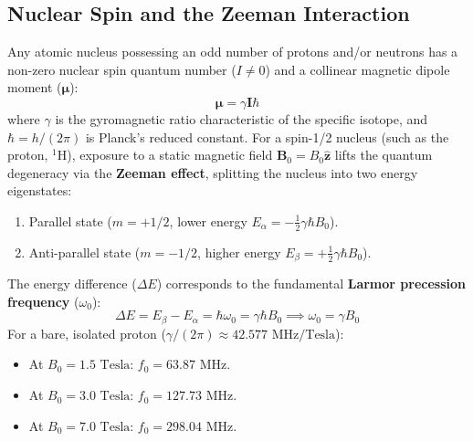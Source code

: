 \documentclass[11pt,a4paper]{article}
\begin{document}
\subsection{Nuclear Spin and the Zeeman Interaction}
Any atomic nucleus possessing an odd number of protons and/or neutrons has a non-zero nuclear spin quantum number ($I \neq 0$) and a collinear magnetic dipole moment ($\boldsymbol{\mu}$):
\begin{equation}
    \boldsymbol{\mu} = \gamma \mathbf{I} \hbar
\end{equation}
where $\gamma$ is the gyromagnetic ratio characteristic of the specific isotope, and $\hbar = h / (2\pi)$ is Planck's reduced constant. For a spin-1/2 nucleus (such as the proton, $^1\text{H}$), exposure to a static magnetic field $\mathbf{B}_0 = B_0 \hat{\mathbf{z}}$ lifts the quantum degeneracy via the \textbf{Zeeman effect}, splitting the nucleus into two energy eigenstates:
\begin{enumerate}
    \item Parallel state ($m = +1/2$, lower energy $E_\alpha = -\frac{1}{2} \gamma \hbar B_0$).
    \item Anti-parallel state ($m = -1/2$, higher energy $E_\beta = +\frac{1}{2} \gamma \hbar B_0$).
\end{enumerate}
The energy difference ($\Delta E$) corresponds to the fundamental \textbf{Larmor precession frequency} ($\omega_0$):
\begin{equation}
    \Delta E = E_\beta - E_\alpha = \hbar \omega_0 = \gamma \hbar B_0 \implies \omega_0 = \gamma B_0
\end{equation}
For a bare, isolated proton ($\gamma / (2\pi) \approx 42.577\text{ MHz/Tesla}$):
\begin{itemize}
    \item At $B_0 = 1.5\text{ Tesla}$: $f_0 = 63.87\text{ MHz}$.
    \item At $B_0 = 3.0\text{ Tesla}$: $f_0 = 127.73\text{ MHz}$.
    \item At $B_0 = 7.0\text{ Tesla}$: $f_0 = 298.04\text{ MHz}$.
\end{itemize}
\end{document}
